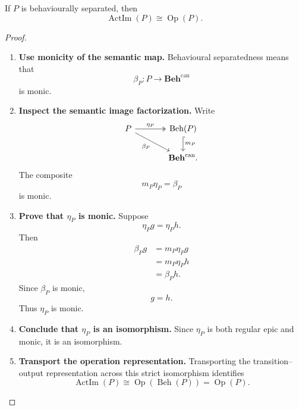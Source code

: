 \begin{corollary}
\label{cor:to-separated-action-image}
    If \(P\) is behaviourally separated, then
    \[
        \operatorname{ActIm}(P)
        \cong
        \operatorname{Op}(P).
    \]
\end{corollary}

\begin{proof}
    \leavevmode
    \begin{enumerate}
        \item \textbf{Use monicity of the semantic map.}
        Behavioural separatedness means that
        \[
            \beta_P:P\to\mathbf{Beh}^{\mathrm{can}}
        \]
        is monic.

        \item \textbf{Inspect the semantic image factorization.}
        Write
        \[
        \begin{tikzcd}[column sep=large]
            P
                \arrow[r, two heads, "\eta_P"]
                \arrow[dr, "\beta_P"']
            &
            \operatorname{Beh}(P)
                \arrow[d, hook, "m_P"]
            \\
            &
            \mathbf{Beh}^{\mathrm{can}}.
        \end{tikzcd}
        \]
        The composite
        \[
            m_P\eta_P=\beta_P
        \]
        is monic.

        \item \textbf{Prove that \(\eta_P\) is monic.}
        Suppose
        \[
            \eta_Pg=\eta_Ph.
        \]
        Then
        \[
        \begin{aligned}
            \beta_Pg
            &=
            m_P\eta_Pg
            \\
            &=
            m_P\eta_Ph
            \\
            &=
            \beta_Ph.
        \end{aligned}
        \]
        Since \(\beta_P\) is monic,
        \[
            g=h.
        \]
        Thus \(\eta_P\) is monic.

        \item \textbf{Conclude that \(\eta_P\) is an isomorphism.}
        Since \(\eta_P\) is both regular epic and monic, it is an isomorphism.

        \item \textbf{Transport the operation representation.}
        Transporting the transition--output representation across this strict
        isomorphism identifies
        \[
            \operatorname{ActIm}(P)
            \cong
            \operatorname{Op}(\operatorname{Beh}(P))
            =
            \operatorname{Op}(P).
        \]
    \end{enumerate}
\end{proof}


